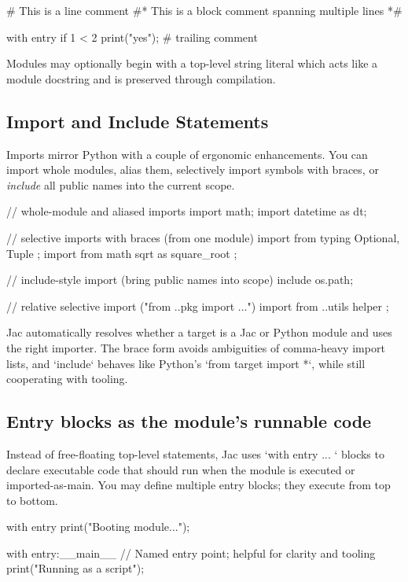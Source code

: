 \begin{jacblock}
# This is a line comment
#*
This is a block comment
spanning multiple lines
*#

with entry {
    if 1 < 2 {
        print("yes");  # trailing comment
    }
}
\end{jacblock}

Modules may optionally begin with a top-level string literal which acts like a module docstring and is preserved through compilation.

\subsection{Import and Include Statements}

Imports mirror Python with a couple of ergonomic enhancements. You can import whole modules, alias them, selectively import symbols with braces, or \emph{include} all public names into the current scope.

\begin{jacblock}
// whole-module and aliased imports
import math;
import datetime as dt;

// selective imports with braces (from one module)
import from typing { Optional, Tuple };
import from math { sqrt as square_root };

// include-style import (bring public names into scope)
include os.path;

// relative selective import ("from ..pkg import {...}")
import from ..utils { helper };
\end{jacblock}

Jac automatically resolves whether a target is a Jac or Python module and uses the right importer. The brace form avoids ambiguities of comma-heavy import lists, and `include` behaves like Python's `from target import *`, while still cooperating with tooling.

\subsection{Entry blocks as the module's runnable code}

Instead of free-floating top-level statements, Jac uses `with entry { ... }` blocks to declare executable code that should run when the module is executed or imported-as-main. You may define multiple entry blocks; they execute from top to bottom.

\begin{jacblock}
with entry {
    print("Booting module...");
}

with entry:__main__ {
    // Named entry point; helpful for clarity and tooling
    print("Running as a script");
}
\end{jacblock}


